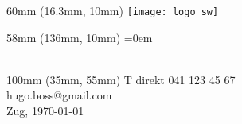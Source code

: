 

\thispagestyle{myheadings}

\iflogo%
\begin{textblock}{60mm\TPHorizModule} (16.3mm\TPHorizModule,
  10mm\TPVertModule)
  \texttt{[image: logo\_sw]}
\end{textblock}
\fi

\iforganisation%
\begin{textblock}{58mm\TPHorizModule} (136mm\TPHorizModule,
  10mm\TPVertModule)
  \parskip=0em%
  \fontsize{8}{9}\selectfont
  \CreatorDirektion\\
  \CreatorAmt\\
  \CreatorDienststelle%
\end{textblock}
\fi

\ifcontact%
\begin{textblock}{100mm\TPHorizModule} (35mm\TPHorizModule,
  55mm\TPVertModule)
  \vspace{-\parskip}%
  \fontsize{8}{9} \selectfont
  T direkt 041 123 45 67\\
  hugo.boss@gmail.com \\
  Zug, \today\\
\end{textblock}
\fi
\phantom{foo}\vspace{-2\baselineskip}
\vspace{22mm}
